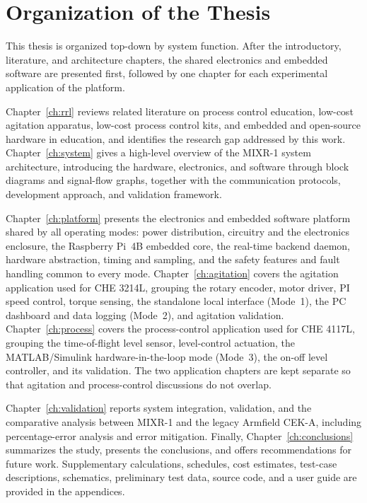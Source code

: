 

\section{Organization of the Thesis}  %
\label{sec:organization}

This thesis is organized top-down by system function. After the introductory, literature, and architecture chapters, the shared electronics and embedded software are presented first, followed by one chapter for each experimental application of the platform.

Chapter~\ref{ch:rrl} reviews related literature on process control education, low-cost agitation apparatus, low-cost process control kits, and embedded and open-source hardware in education, and identifies the research gap addressed by this work. Chapter~\ref{ch:system} gives a high-level overview of the MIXR-1 system architecture, introducing the hardware, electronics, and software through block diagrams and signal-flow graphs, together with the communication protocols, development approach, and validation framework.

Chapter~\ref{ch:platform} presents the electronics and embedded software platform shared by all operating modes: power distribution, circuitry and the electronics enclosure, the Raspberry Pi~4B embedded core, the real-time backend daemon, hardware abstraction, timing and sampling, and the safety features and fault handling common to every mode. Chapter~\ref{ch:agitation} covers the agitation application used for CHE 3214L, grouping the rotary encoder, motor driver, PI speed control, torque sensing, the standalone local interface (Mode~1), the PC dashboard and data logging (Mode~2), and agitation validation. Chapter~\ref{ch:process} covers the process-control application used for CHE 4117L, grouping the time-of-flight level sensor, level-control actuation, the MATLAB/Simulink hardware-in-the-loop mode (Mode~3), the on-off level controller, and its validation. The two application chapters are kept separate so that agitation and process-control discussions do not overlap.

Chapter~\ref{ch:validation} reports system integration, validation, and the comparative analysis between MIXR-1 and the legacy Armfield CEK-A, including percentage-error analysis and error mitigation. Finally, Chapter~\ref{ch:conclusions} summarizes the study, presents the conclusions, and offers recommendations for future work. Supplementary calculations, schedules, cost estimates, test-case descriptions, schematics, preliminary test data, source code, and a user guide are provided in the appendices.